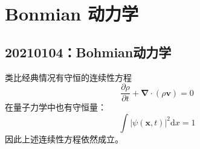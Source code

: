 \chapter{Bonmian 动力学}
    \section{20210104：Bohmian动力学}

        类比经典情况有守恒的连续性方程
        \begin{equation*}
            \frac {\partial \rho}{\partial t} + \bm{\nabla} \cdot (\rho \bm{v}) = 0
        \end{equation*}
        在量子力学中也有守恒量：
        \begin{equation*}
            \int |\psi(\bm{x},t)|^2 \mathrm{d}x = 1
        \end{equation*}
        因此上述连续性方程依然成立。


